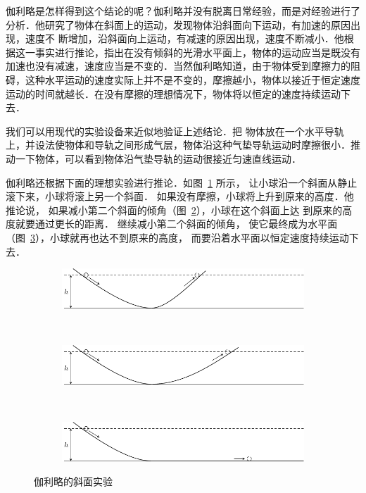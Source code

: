 伽利略是怎样得到这个结论的呢？伽利略并没有脱离日常经验，而是对经验进行了分析．他研究了物体在斜面上的运动，发现物体沿斜面向下运动，有加速的原因出现，速度不
断增加，沿斜面向上运动，有减速的原因出现，速度不断减小．他根据这一事实进行推论，指出在没有倾斜的光滑水平面上，物体的运动应当是既没有加速也没有减速，速度应当是不变的．当然伽利略知道，由于物体受到摩擦力的阻碍，这种水平运动的速度实际上并不是不变的，摩擦越小，物体以接近于恒定速度运动的时间就越长．在没有摩擦的理想情况下，物体将以恒定的速度持续运动下去．

我们可以用现代的实验设备来近似地验证上述结论．把
物体放在一个水平导轨上，并设法使物体和导轨之间形成气层，物体沿这种气垫导轨运动时摩擦很小．推动一下物体，可以看到物体沿气垫导轨的运动很接近匀速直线运动．



伽利略还根据下面的理想实验进行推论．如图~\ref{fig_A_3-1a} 所示，
让小球沿一个斜面从静止滚下来，小球将滚上另一个斜面．
如果没有摩擦，小球将上升到原来的高度．他推论说，
如果减小第二个斜面的倾角（图~\ref{fig_A_3-1b}），小球在这个斜面上达
到原来的高度就要通过更长的距离．
继续减小第二个斜面的倾角，
使它最终成为水平面（图~\ref{fig_A_3-1c}），小球就再也达不到原来的高度，
而要沿着水平面以恒定速度持续运动下去．
\begin{figure}[htbp]
	\centering
	\begin{subfigure} {1\linewidth} 
		\centering
		\includegraphics{fig/A/3-1a.pdf} 
		\caption{}\label{fig_A_3-1a} 
	\end{subfigure}
	\\
	\begin{subfigure} {1\linewidth} 
		\centering
		\includegraphics{fig/A/3-1b.pdf} 
		\caption{}\label{fig_A_3-1b} 
	\end{subfigure}
	\\
	\begin{subfigure} {1\linewidth} 
		\centering
		\includegraphics{fig/A/3-1c.pdf} 
		\caption{}\label{fig_A_3-1c} 
	\end{subfigure}
	\caption{伽利略的斜面实验}\label{fig_A_3-1}
\end{figure}


